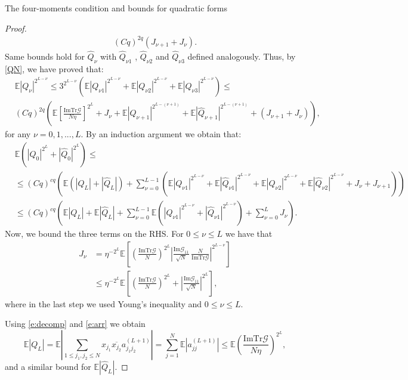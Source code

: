 \documentclass[11pt, a4paper, oneside]{book}
\numberwithin{equation}{chapter}
\newcommand{\E}{\mathbb E}
\newcommand{\Tr}{\mathrm{Tr}}
\begin{document}
\begin{section}{The four-moments condition and bounds for quadratic forms}
\begin{proof}
\begin{align}
 (Cq)^{2q}(J_{\nu+1} + J_{\nu}).
\end{align}
%
Same bounds hold for $\widehat{Q}_{\nu}$ with $\widehat{Q}_{\nu1}$ , $\widehat{Q}_{\nu2}$ and $\widehat{Q}_{\nu3}$ defined analogously. Thus, by \eqref{QN}, we have proved that:
%
\begin{align*}
&\E | Q_{\nu}  |^{2^{L-\nu}} \leq 3^{2^{L-\nu}} \left ( \E | Q_{\nu1}  |^{2^{L-\nu}} + \E | Q_{\nu2}  |^{2^{L-\nu}} + \E | Q_{\nu3}  |^{2^{L-\nu}} \right ) \leq \\
&(Cq)^{2q} \left (  \E \left [\frac{\mathrm{Im} \Tr \mathcal{G}  }{N\eta}  \right ]^{2^L} +  J_{\nu} +  \E |Q_{\nu+1} |^{2^{L-(\nu+1)}} + \E |\widehat{Q}_{\nu+1} |^{2^{L-(\nu+1)}} + (J_{\nu+1} + J_{\nu})  \right ),
\end{align*}
%
for any $\nu = 0,1,...,L.$
%
By an induction argument we obtain that:
%
\begin{align} \label{induction}
 &\E(|Q_0|^{2^L}+|\widehat{Q}_0|^{2^L}) \leq \nonumber
 \\
 &\leq (Cq)^{cq}\left(\E(|Q_{L}|+|\widehat{Q}_{L}|) +  \sum_{\nu=0}^{L-1} \left( \E |Q_{\nu1}|^{2^{L-\nu}}+\E| \widehat{Q}_{\nu1}|^{2^{L-\nu}}+ \E|Q_{\nu2}|^{2^{L-\nu}}+\E|\widehat{Q}_{\nu2}|^{2^{L-\nu}}
 + J_\nu + J_{\nu+1}\right)\right) \nonumber
 \\
 &\leq
  (Cq)^{cq}\left(\E|Q_{L}| + \E |\widehat{Q}_{L}| + \sum_{\nu=0}^{L-1} \E \left (|Q_{\nu1}|^{2^{L-\nu}}+|\widehat{Q}_{\nu1}|^{2^{L-\nu}} \right )+ \sum_{\nu=0}^{L}
 J_\nu\right).
\end{align}
%
Now, we bound the three terms on the RHS. For $0 \leq \nu \leq L$ we have that
%
\begin{align} \label{JN}
J_\nu &= \eta^{-2^L}\E \left [ \left( \frac{\mathrm{Im} \Tr \mathcal{G}  }{N} \right)^{2^L}\left|\frac{\mathrm{Im} \mathcal{G} _{11}}{\sqrt N}\, \frac{N}{\mathrm{Im} \Tr \mathcal{G}  }\right|^{2^{L-\nu}} \right ] \nonumber
\\
&\leq \eta^{-2^L}\E\left[ \left( \frac{\mathrm{Im} \Tr \mathcal{G}  }{N}\right)^{2^{L}} + \left|\frac{\mathrm{Im} \mathcal{G} _{11}}{\sqrt N}\right|^{2^{L}}\right ] ,
\end{align}
%
where in the last step we used Young's inequality and $0 \leq \nu \leq L.$

Using \eqref{e:decomp} and \eqref{e:arr} we obtain
%
\begin{equation} \label{QL}
\E |Q_L| = \E  \left | \sum_{1 \leq j_1, j_2 \leq N}x_{j_1} \overline{x_{j_2}}   a_{j_1j_2}^{(L+1)} \right | = \sum_{j=1}^N \E |a_{jj}^{(L+1)}| \leq \E\left(\frac{\mathrm{Im} \Tr \mathcal{G}  }{N\eta}\right)^{2^L},
\end{equation}
%
and a similar bound for $\E |\widehat{Q}_L|.$ 


\end{proof}
\end{section}
\end{document}
